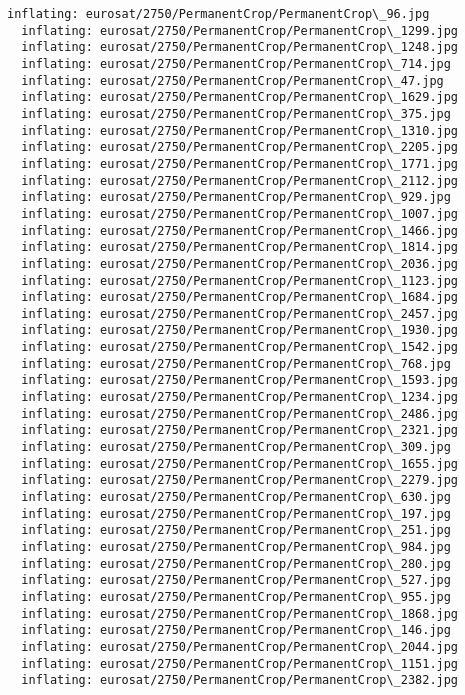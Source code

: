 \documentclass[11pt]{article}
\begin{document}
\begin{Verbatim}[commandchars=\\\{\}]
  inflating: eurosat/2750/PermanentCrop/PermanentCrop\_96.jpg
  inflating: eurosat/2750/PermanentCrop/PermanentCrop\_1299.jpg
  inflating: eurosat/2750/PermanentCrop/PermanentCrop\_1248.jpg
  inflating: eurosat/2750/PermanentCrop/PermanentCrop\_714.jpg
  inflating: eurosat/2750/PermanentCrop/PermanentCrop\_47.jpg
  inflating: eurosat/2750/PermanentCrop/PermanentCrop\_1629.jpg
  inflating: eurosat/2750/PermanentCrop/PermanentCrop\_375.jpg
  inflating: eurosat/2750/PermanentCrop/PermanentCrop\_1310.jpg
  inflating: eurosat/2750/PermanentCrop/PermanentCrop\_2205.jpg
  inflating: eurosat/2750/PermanentCrop/PermanentCrop\_1771.jpg
  inflating: eurosat/2750/PermanentCrop/PermanentCrop\_2112.jpg
  inflating: eurosat/2750/PermanentCrop/PermanentCrop\_929.jpg
  inflating: eurosat/2750/PermanentCrop/PermanentCrop\_1007.jpg
  inflating: eurosat/2750/PermanentCrop/PermanentCrop\_1466.jpg
  inflating: eurosat/2750/PermanentCrop/PermanentCrop\_1814.jpg
  inflating: eurosat/2750/PermanentCrop/PermanentCrop\_2036.jpg
  inflating: eurosat/2750/PermanentCrop/PermanentCrop\_1123.jpg
  inflating: eurosat/2750/PermanentCrop/PermanentCrop\_1684.jpg
  inflating: eurosat/2750/PermanentCrop/PermanentCrop\_2457.jpg
  inflating: eurosat/2750/PermanentCrop/PermanentCrop\_1930.jpg
  inflating: eurosat/2750/PermanentCrop/PermanentCrop\_1542.jpg
  inflating: eurosat/2750/PermanentCrop/PermanentCrop\_768.jpg
  inflating: eurosat/2750/PermanentCrop/PermanentCrop\_1593.jpg
  inflating: eurosat/2750/PermanentCrop/PermanentCrop\_1234.jpg
  inflating: eurosat/2750/PermanentCrop/PermanentCrop\_2486.jpg
  inflating: eurosat/2750/PermanentCrop/PermanentCrop\_2321.jpg
  inflating: eurosat/2750/PermanentCrop/PermanentCrop\_309.jpg
  inflating: eurosat/2750/PermanentCrop/PermanentCrop\_1655.jpg
  inflating: eurosat/2750/PermanentCrop/PermanentCrop\_2279.jpg
  inflating: eurosat/2750/PermanentCrop/PermanentCrop\_630.jpg
  inflating: eurosat/2750/PermanentCrop/PermanentCrop\_197.jpg
  inflating: eurosat/2750/PermanentCrop/PermanentCrop\_251.jpg
  inflating: eurosat/2750/PermanentCrop/PermanentCrop\_984.jpg
  inflating: eurosat/2750/PermanentCrop/PermanentCrop\_280.jpg
  inflating: eurosat/2750/PermanentCrop/PermanentCrop\_527.jpg
  inflating: eurosat/2750/PermanentCrop/PermanentCrop\_955.jpg
  inflating: eurosat/2750/PermanentCrop/PermanentCrop\_1868.jpg
  inflating: eurosat/2750/PermanentCrop/PermanentCrop\_146.jpg
  inflating: eurosat/2750/PermanentCrop/PermanentCrop\_2044.jpg
  inflating: eurosat/2750/PermanentCrop/PermanentCrop\_1151.jpg
  inflating: eurosat/2750/PermanentCrop/PermanentCrop\_2382.jpg

\end{Verbatim}
\end{document}
